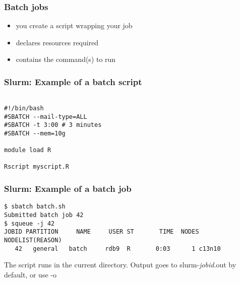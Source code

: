 \documentclass[10pt]{beamer}
\newcommand\smallfont{\fontsize{8pt}{7.2}\selectfont}
\newcommand\regfont{\fontsize{10pt}{7.2}\selectfont}
\begin{document}
\begin{frame}[fragile]
\frametitle{Batch jobs}
\begin{itemize}
\item you create a script wrapping your job
\item declares resources required
\item contains the command(s) to run
\end{itemize}

\end{frame}

\begin{frame}[fragile]
\frametitle{Slurm: Example of a batch script}

\begin{block}{}
\begin{verbatim}

#!/bin/bash
#SBATCH --mail-type=ALL
#SBATCH -t 3:00 # 3 minutes
#SBATCH --mem=10g

module load R

Rscript myscript.R
\end{verbatim}
\end{block}{}
\end{frame}

\begin{frame}[fragile]
\frametitle{Slurm: Example of a batch job}
\smallfont
\begin{verbatim}
$ sbatch batch.sh
Submitted batch job 42
$ squeue -j 42
JOBID PARTITION     NAME     USER ST       TIME  NODES NODELIST(REASON)
   42   general   batch     rdb9  R       0:03      1 c13n10
\end{verbatim}
\vskip14pt
\regfont
The script runs in the current directory.  
Output goes to slurm-\textit{jobid}.out by default, or use -o
\end{frame}


\end{document}
